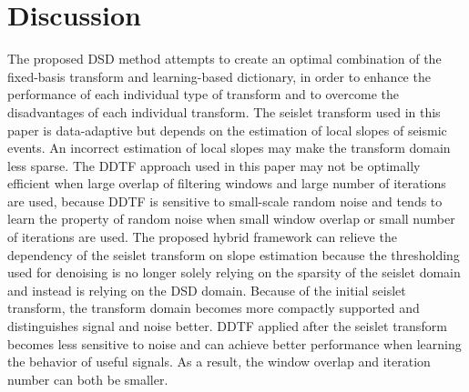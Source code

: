 \section{Discussion}
The proposed DSD method attempts to create an optimal combination of the fixed-basis transform and learning-based dictionary, in order to enhance the performance of each individual type of transform and to 
overcome the disadvantages of each individual transform. The seislet transform used in this paper is data-adaptive but depends on the estimation of local slopes of seismic events. An incorrect estimation
of local slopes may make the transform domain less sparse. The DDTF approach used in this paper may not be optimally efficient when large overlap of filtering windows and large number of iterations 
are used, because DDTF is sensitive to small-scale random noise and tends to learn the property of random noise when small window overlap or small number of iterations are used. 
The proposed hybrid framework can relieve the dependency of the seislet transform on slope estimation because the thresholding used for denoising is no longer solely relying on the
sparsity of the seislet domain and instead  is relying on the DSD domain. Because of the initial seislet transform, the transform domain becomes more compactly supported and 
distinguishes signal and noise better. DDTF applied after the seislet transform becomes less sensitive to noise and can achieve better performance when learning the behavior of useful signals. As a result, the 
window overlap and iteration number can both be smaller.

